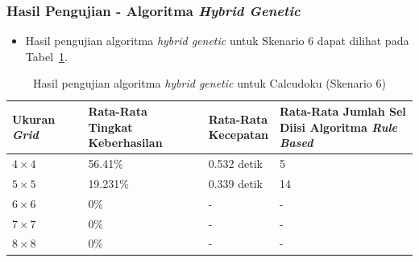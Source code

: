 \documentclass{beamer}
\begin{document}
\begin{frame}
\frametitle{Hasil Pengujian - Algoritma \textit{Hybrid Genetic}}
\begin{itemize}
\item Hasil pengujian algoritma \textit{hybrid genetic} untuk Skenario 6 dapat dilihat pada Tabel~\ref{tab:pengujianhg6}.
\end{itemize}
\begin{table}
\tiny
\centering
\captionsetup{justification=centering}
\caption[Hasil pengujian algoritma \textit{hybrid genetic} untuk Calcudoku (Skenario 6)]{Hasil pengujian algoritma \textit{hybrid genetic} untuk Calcudoku (Skenario 6)}
\begin{tabular}{| l | l | l | l |}
\hline
Ukuran \textit{Grid} & \makecell[c]{Rata-Rata \\ Tingkat Keberhasilan} & \makecell[c]{Rata-Rata \\ Kecepatan} & \makecell[c]{Rata-Rata Jumlah Sel \\ Diisi Algoritma \textit{Rule Based}} \\
\hline \hline
\begin{math}4 \times 4\end{math} & 56.41\% & 0.532 detik & 5 \\
\hline
\begin{math}5 \times 5\end{math} & 19.231\% & 0.339 detik & 14 \\
\hline
\begin{math}6 \times 6\end{math} & 0\% & - & - \\
\hline
\begin{math}7 \times 7\end{math} & 0\% & - & - \\
\hline
\begin{math}8 \times 8\end{math} & 0\% & - & - \\
\hline
\end{tabular}
\label{tab:pengujianhg6}
\end{table}
\end{frame}

\end{document}
